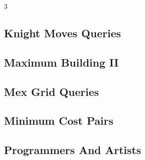 \documentclass[8pt]{extarticle}
\begin{document}
\begin{multicols*}{3}
\subsection{Knight Moves Queries}
\begin{caixaenunciado}

\end{caixaenunciado}
\vspace{0.3cm}


\subsection{Maximum Building II}
\begin{caixaenunciado}

\end{caixaenunciado}
\vspace{0.3cm}


\subsection{Mex Grid Queries}
\begin{caixaenunciado}

\end{caixaenunciado}
\vspace{0.3cm}


\subsection{Minimum Cost Pairs}
\begin{caixaenunciado}

\end{caixaenunciado}
\vspace{0.3cm}


\subsection{Programmers And Artists}
\begin{caixaenunciado}

\end{caixaenunciado}
\vspace{0.3cm}



\end{multicols*}
\end{document}
